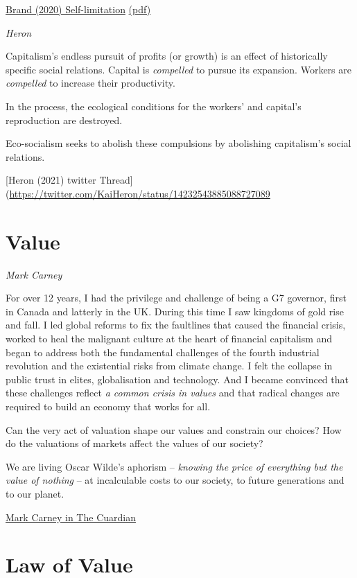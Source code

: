\documentclass[
]{book}
\begin{document}
\href{https://www.tandfonline.com/doi/full/10.1080/15487733.2021.1940754}{Brand (2020) Self-limitation}
\href{pdf/Brand_2021_Self_Limitation.pdf}{(pdf)}

\emph{Heron}

Capitalism's endless pursuit of profits (or growth) is an effect of historically specific social relations. Capital is \emph{compelled} to pursue its expansion. Workers are \emph{compelled} to increase their productivity.

In the process, the ecological conditions for the workers' and capital's reproduction are destroyed.

Eco-socialism seeks to abolish these compulsions by abolishing capitalism's social relations.

{[}Heron (2021) twitter Thread{]}(\url{https://twitter.com/KaiHeron/status/14232543885088727089}

\hypertarget{value}{%
\chapter{Value}\label{value}}

\emph{Mark Carney}

For over 12 years, I had the privilege and challenge of being a G7 governor, first in Canada and latterly in the UK. During this time I saw kingdoms of gold rise and fall. I led global reforms to fix the faultlines that caused the financial crisis, worked to heal the malignant culture at the heart of financial capitalism and began to address both the fundamental challenges of the fourth industrial revolution and the existential risks from climate change. I felt the collapse in public trust in elites, globalisation and technology. And I became convinced that these challenges reflect \emph{a common crisis in values} and that radical changes are required to build an economy that works for all.

Can the very act of valuation shape our values and constrain our choices? How do the valuations of markets affect the values of our society?

We are living Oscar Wilde's aphorism -- \emph{knowing the price of everything but the value of nothing} -- at incalculable costs to our society, to future generations and to our planet.

\href{https://www.theguardian.com/business/2021/mar/13/crisis-in-values-exclusive-extract-mark-carneys-book}{Mark Carney in The Cuardian}

\hypertarget{law-of-value}{%
\chapter{Law of Value}\label{law-of-value}}
\end{document}
